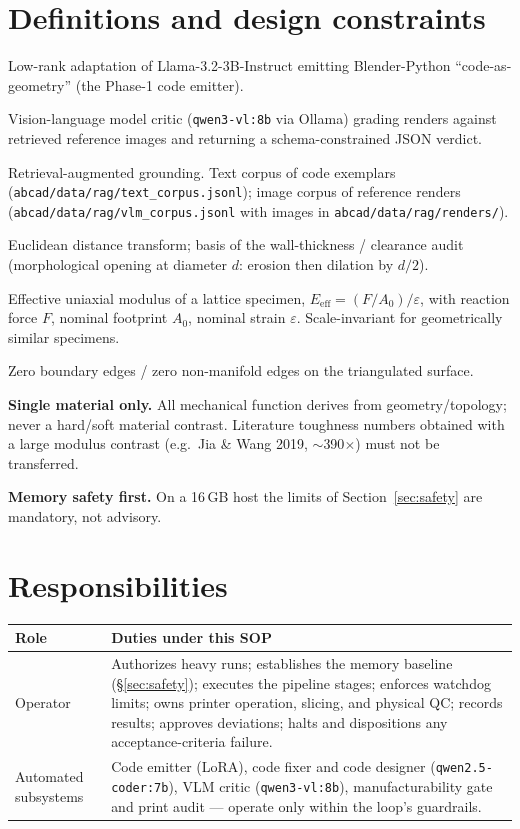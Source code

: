 \documentclass[11pt]{article}
\begin{document}
\section{Definitions and design constraints}\label{sec:defs}
\begin{description}[nosep]
  \item[LoRA] Low-rank adaptation of Llama-3.2-3B-Instruct emitting Blender-Python
        ``code-as-geometry'' (the Phase-1 code emitter).
  \item[VLM] Vision-language model critic (\texttt{qwen3-vl:8b} via Ollama) grading renders against
        retrieved reference images and returning a schema-constrained JSON verdict.
  \item[RAG] Retrieval-augmented grounding. Text corpus of code exemplars
        (\texttt{abcad/data/rag/text\_corpus.jsonl}); image corpus of reference renders
        (\texttt{abcad/data/rag/vlm\_corpus.jsonl} with images in \texttt{abcad/data/rag/renders/}).
  \item[EDT] Euclidean distance transform; basis of the wall-thickness / clearance audit
        (morphological opening at diameter $d$: erosion then dilation by $d/2$).
  \item[$E_\mathrm{eff}$] Effective uniaxial modulus of a lattice specimen,
        $E_\mathrm{eff} = (F/A_0)/\varepsilon$, with reaction force $F$, nominal footprint $A_0$,
        nominal strain $\varepsilon$. Scale-invariant for geometrically similar specimens.
  \item[Watertight / manifold] Zero boundary edges / zero non-manifold edges on the triangulated surface.
  \item[C1 (constraint)] \textbf{Single material only.} All mechanical function derives from
        geometry/topology; never a hard/soft material contrast. Literature toughness numbers obtained
        with a large modulus contrast (e.g.\ Jia \& Wang 2019, $\sim$390$\times$) must not be transferred.
  \item[C2 (constraint)] \textbf{Memory safety first.} On a 16\,GB host the limits of
        Section~\ref{sec:safety} are mandatory, not advisory.
\end{description}

\section{Responsibilities}
\begin{tabularx}{\linewidth}{@{}lX@{}}
\toprule
Role & Duties under this SOP \\
\midrule
Operator & Authorizes heavy runs; establishes the memory baseline (\S\ref{sec:safety}); executes the
pipeline stages; enforces watchdog limits; owns printer operation, slicing, and physical QC; records
results; approves deviations; halts and dispositions any acceptance-criteria failure. \\
Automated subsystems & Code emitter (LoRA), code fixer and code designer (\texttt{qwen2.5-coder:7b}),
VLM critic (\texttt{qwen3-vl:8b}), manufacturability gate and print audit --- operate only within the
loop's guardrails. \\
\bottomrule
\end{tabularx}
\end{document}
